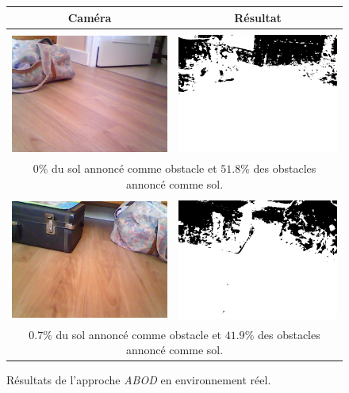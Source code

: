 \documentclass{article}
\begin{document}
\begin{figure}
    \begin{center}
        \begin{tabular}{|cc|}
            \hline
            \textbf{Caméra} & \textbf{Résultat} \\
            \hline & \\
            \includegraphics[width=0.4\linewidth]{rcs/abodr0s.png} & \includegraphics[width=0.4\linewidth]{rcs/abodr0r.png} \\
            \multicolumn{2}{|c|}{$0\%$ du sol annoncé comme obstacle et $51.8\%$ des obstacles annoncé comme sol.} \\
            \hline & \\
            \includegraphics[width=0.4\linewidth]{rcs/abodr1s.png} & \includegraphics[width=0.4\linewidth]{rcs/abodr1r.png} \\
            \multicolumn{2}{|c|}{$0.7\%$ du sol annoncé comme obstacle et $41.9\%$ des obstacles annoncé comme sol.} \\
            \hline
        \end{tabular}
    \end{center}
    \caption{Résultats de l'approche \emph{ABOD} en environnement réel.}
    \label{abod_exp}
\end{figure}
\end{document}
